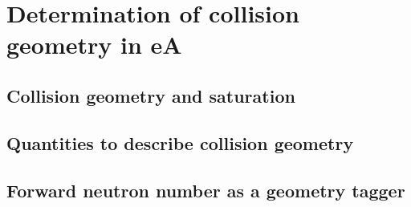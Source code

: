 \chapter{Determination of collision geometry in eA} \label{chp:geometry}

\section{Collision geometry and saturation}

\section{Quantities to describe collision geometry}

\section{Forward neutron number as a geometry tagger}